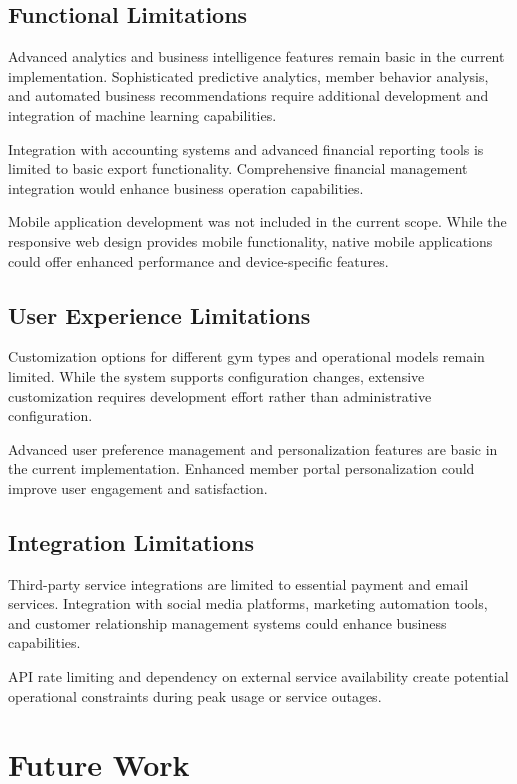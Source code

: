 \documentclass[12pt,a4paper]{report}
\begin{document}
\subsection{Functional Limitations}

Advanced analytics and business intelligence features remain basic in the current implementation. Sophisticated predictive analytics, member behavior analysis, and automated business recommendations require additional development and integration of machine learning capabilities.

Integration with accounting systems and advanced financial reporting tools is limited to basic export functionality. Comprehensive financial management integration would enhance business operation capabilities.

Mobile application development was not included in the current scope. While the responsive web design provides mobile functionality, native mobile applications could offer enhanced performance and device-specific features.

\subsection{User Experience Limitations}

Customization options for different gym types and operational models remain limited. While the system supports configuration changes, extensive customization requires development effort rather than administrative configuration.

Advanced user preference management and personalization features are basic in the current implementation. Enhanced member portal personalization could improve user engagement and satisfaction.

\subsection{Integration Limitations}

Third-party service integrations are limited to essential payment and email services. Integration with social media platforms, marketing automation tools, and customer relationship management systems could enhance business capabilities.

API rate limiting and dependency on external service availability create potential operational constraints during peak usage or service outages.

\section{Future Work}
\label{sec:future-work}
\end{document}
